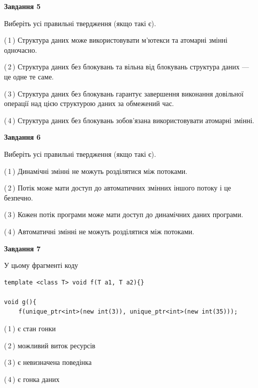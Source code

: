 \documentclass[12pt, ukrainian]{article}
\begin{document}
\begin {large}
{\begin{center}
\textbf{Завдання 5}
\end{center}

Виберіть усі правильні твердження (якщо такі є).\par
\vspace{2mm}

(\,1\,) Структура даних може використовувати м’ютекси та атомарні змінні одночасно.%

(\,2\,) Структура даних без блокувань та вільна від блокувань структура даних --- це одне те саме.%

(\,3\,) Структура даних без блокувань гарантує завершення виконання довільної операції над цією структурою даних за обмежений час.%

(\,4\,) Структура даних без блокувань зобов’язана використовувати атомарні змінні.%
\newpage


\begin{center}
\textbf{Завдання 6}
\end{center}

Виберіть усі правильні твердження (якщо такі є).\par
\vspace{2mm}

(\,1\,) Динамічні змінні не можуть розділятися між потоками.%

(\,2\,) Потік може мати доступ до автоматичних змінних іншого потоку і це безпечно.%

(\,3\,) Кожен потік програми може мати доступ до динамічних даних програми.%

(\,4\,) Автоматичні змінні не можуть розділятися між потоками.%


\begin{center}
\textbf{Завдання 7}
\end{center}

У цьому фрагменті коду
\begin{verbatim}
template <class T> void f(T a1, T a2){}

void g(){
    f(unique_ptr<int>(new int(3)), unique_ptr<int>(new int(35)));
\end{verbatim}

(\,1\,) є стан гонки%

(\,2\,) можливий виток ресурсів%

(\,3\,) є невизначена поведінка%

(\,4\,) є гонка даних%

}
\end {large}

\vspace{4mm}
\newpage
\end{document}
